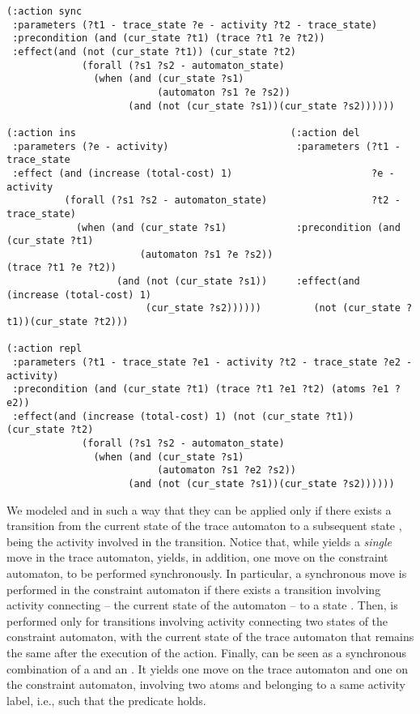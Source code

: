 \begin{scriptsize}
\begin{verbatim}
(:action sync
 :parameters (?t1 - trace_state ?e - activity ?t2 - trace_state)
 :precondition (and (cur_state ?t1) (trace ?t1 ?e ?t2))
 :effect(and (not (cur_state ?t1)) (cur_state ?t2)
             (forall (?s1 ?s2 - automaton_state)
               (when (and (cur_state ?s1)
                          (automaton ?s1 ?e ?s2))
                     (and (not (cur_state ?s1))(cur_state ?s2))))))

(:action ins                                     (:action del
 :parameters (?e - activity)                      :parameters (?t1 - trace_state
 :effect (and (increase (total-cost) 1)                        ?e - activity
          (forall (?s1 ?s2 - automaton_state)                  ?t2 - trace_state)
            (when (and (cur_state ?s1)            :precondition (and (cur_state ?t1)
                       (automaton ?s1 ?e ?s2))                     (trace ?t1 ?e ?t2))
                   (and (not (cur_state ?s1))     :effect(and (increase (total-cost) 1)
                        (cur_state ?s2))))))         (not (cur_state ?t1))(cur_state ?t2)))

(:action repl
 :parameters (?t1 - trace_state ?e1 - activity ?t2 - trace_state ?e2 - activity)
 :precondition (and (cur_state ?t1) (trace ?t1 ?e1 ?t2) (atoms ?e1 ?e2))
 :effect(and (increase (total-cost) 1) (not (cur_state ?t1)) (cur_state ?t2)
             (forall (?s1 ?s2 - automaton_state)
               (when (and (cur_state ?s1)
                          (automaton ?s1 ?e2 ?s2))
                     (and (not (cur_state ?s1))(cur_state ?s2))))))
\end{verbatim}
\end{scriptsize}
\smallskip

\noindent
We modeled  and  in such a way that they can be applied only if there exists a transition from the current state  of the trace automaton to a subsequent state , being  the activity involved in the transition.
Notice that, while  yields a \emph{single} move in the trace automaton,  yields, in addition, one move on the constraint automaton, to be performed synchronously. In particular, a synchronous move is performed in the constraint automaton if there exists a transition involving activity  connecting  -- the current state of the automaton -- to a state .
%
Then,  is performed only for transitions involving activity  connecting two states of the constraint automaton, with the current state of the trace automaton that remains the same after the execution of the action.
%
Finally,  can be seen as a synchronous combination of a  and an . It yields one move on the trace automaton and one on the constraint automaton, involving two atoms  and  belonging to a same activity label, i.e., such that the predicate  holds.

